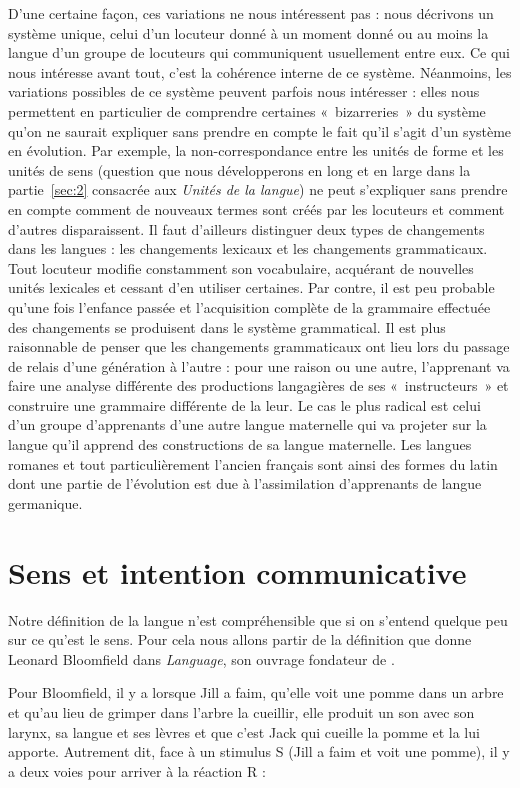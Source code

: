 {    D’une certaine façon, ces variations ne nous intéressent pas : nous décrivons un système unique, celui d’un locuteur donné à un moment donné ou au moins la langue d’un groupe de locuteurs qui communiquent usuellement entre eux. Ce qui nous intéresse avant tout, c’est la cohérence interne de ce système. Néanmoins, les variations possibles de ce système peuvent parfois nous intéresser : elles nous permettent en particulier de comprendre certaines «~bizarreries~» du système qu’on ne saurait expliquer sans prendre en compte le fait qu’il s’agit d’un système en évolution. Par exemple, la non-correspondance entre les unités de forme et les unités de sens (question que nous développerons en long et en large dans la partie~\ref{sec:2} consacrée aux \textit{Unités de la langue}) ne peut s’expliquer sans prendre en compte comment de nouveaux termes sont créés par les locuteurs et comment d’autres disparaissent. Il faut d’ailleurs distinguer deux types de changements dans les langues : les changements lexicaux et les changements grammaticaux. Tout locuteur modifie constamment son vocabulaire, acquérant de nouvelles unités lexicales et cessant d’en utiliser certaines. Par contre, il est peu probable qu’une fois l’enfance passée et l’acquisition complète de la grammaire effectuée des changements se produisent dans le système grammatical. Il est plus raisonnable de penser que les changements grammaticaux ont lieu lors du passage de relais d’une génération à l’autre : pour une raison ou une autre, l’apprenant va faire une analyse différente des productions langagières de ses «~instructeurs~» et construire une grammaire différente de la leur. Le cas le plus radical est celui d’un groupe d’apprenants d’une autre langue maternelle qui va projeter sur la langue qu’il apprend des constructions de sa langue maternelle. Les langues romanes et tout particulièrement l’ancien français sont ainsi des formes du latin dont une partie de l’évolution est due à l’assimilation d’apprenants de langue germanique.
}
\section{Sens et intention communicative}\label{sec:1.1.4}

Notre définition de la langue n’est compréhensible que si on s’entend quelque peu sur ce qu’est le sens. Pour cela nous allons partir de la définition que donne Leonard Bloomfield dans \textit{Language}, son ouvrage fondateur de \citeyear{bloomfield1933language}.

Pour Bloomfield, il y a  lorsque Jill a faim, qu’elle voit une pomme dans un arbre et qu’au lieu de grimper dans l’arbre la cueillir, elle produit un son avec son larynx, sa langue et ses lèvres et que c’est Jack qui cueille la pomme et la lui apporte. Autrement dit, face à un stimulus S (Jill a faim et voit une pomme), il y a deux voies pour arriver à la réaction R :

